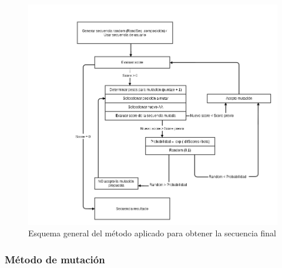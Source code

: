 \begin{figure}[htbp]
\centering
   \includegraphics[width=\textwidth]{img/diagrama-algoritmo.png}
 \caption{Esquema general del método aplicado para obtener la secuencia final}
 \label{fig:esquema-algoritmo}
\end{figure}



\subsubsection{Método de mutación}
